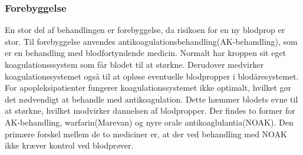 \subsubsection{Forebyggelse}
En stor del af behandlingen er forebyggelse, da risikoen for en ny blodprop er stor. Til forebyggelse anvendes antikoagulationsbehandling(AK-behandling), som er en behandling med blodfortyndende medicin. Normalt har kroppen sit eget koagulationsssystem som får blodet til at størkne. Derudover medvirker koagulationssystemet også til at opløse eventuelle blodpropper i blodåresystemet. For apopleksipatienter fungerer koagulationssystemet ikke optimalt, hvilket gør det nødvendigt at behandle med antikoagulation. Dette hæmmer blodets evne til at størkne, hvilket modvirker dannelsen af blodpropper. Der findes to former for AK-behandling, warfarin(Marevan) og nyre orale antikoaglulantia(NOAK). Den primære forskel mellem de to mediciner er, at der ved behandling med NOAK ikke kræver kontrol ved blodprøver.\cite{Kjaergaard2015}

